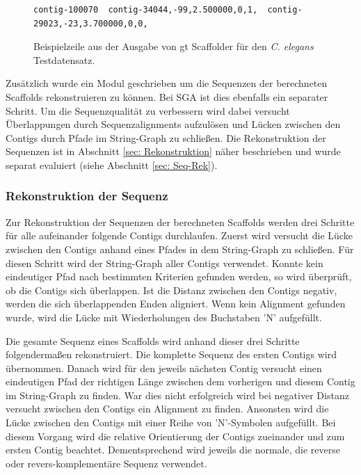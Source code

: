 \documentclass[a4paper,11pt,parskip]{scrartcl}
\begin{document}
\begin{figure}
\begin{verbatim}
contig-100070  contig-34044,-99,2.500000,0,1,  contig-29023,-23,3.700000,0,0,
\end{verbatim}
\caption{\label{abb: scaf}Beispielzeile aus der Ausgabe von gt
  Scaffolder für den \textit{C. elegans} Testdatensatz.}
\end{figure}

Zusätzlich wurde ein Modul geschrieben um die Sequenzen der
berechneten Scaffolds rekonstruieren zu können. Bei SGA ist dies
ebenfalls ein separater Schritt. Um die Sequenzqualität zu verbessern
wird dabei versucht Überlappungen durch Sequenzalignments aufzulösen
und Lücken zwischen den Contigs durch Pfade im String-Graph zu
schließen. Die Rekonstruktion der Sequenzen ist in Abschnitt \ref{sec:
  Rekonstruktion} näher beschrieben und wurde separat evaluiert (siehe
Abschnitt \ref{sec: Seq-Rek}).

\subsubsection{Rekonstruktion der Sequenz}
\label{sec: Rekonstruktion}
Zur Rekonstruktion der Sequenzen der berechneten Scaffolds werden drei
Schritte für alle aufeinander folgende Contigs durchlaufen. Zuerst
wird versucht die Lücke zwischen den Contigs anhand eines Pfades
in dem String-Graph zu schließen. Für diesen Schritt wird der
String-Graph aller Contigs verwendet. Konnte kein eindeutiger Pfad nach
bestimmten Kriterien gefunden werden, so wird überprüft, ob die
Contigs sich überlappen. Ist die Distanz zwischen den Contigs negativ,
werden die sich überlappenden Enden aligniert. Wenn kein Alignment
gefunden wurde, wird die Lücke mit Wiederholungen des Buchstaben 'N'
aufgefüllt.

Die gesamte Sequenz eines Scaffolds wird anhand dieser drei Schritte
folgendermaßen rekonstruiert. Die komplette Sequenz des ersten Contigs
wird übernommen. Danach wird für den jeweils nächsten Contig versucht
einen eindeutigen Pfad der richtigen Länge zwischen dem vorherigen und
diesem Contig im String-Graph zu finden. War dies nicht erfolgreich
wird bei negativer Distanz versucht zwischen den Contigs ein Alignment
zu finden. Ansonsten wird die Lücke zwischen den Contigs mit einer Reihe
von 'N'-Symbolen aufgefüllt. Bei diesem Vorgang wird die relative
Orientierung der Contigs zueinander und zum ersten Contig
beachtet. Dementsprechend wird jeweils die normale, die reverse oder
revers-komplementäre Sequenz verwendet.
\end{document}
